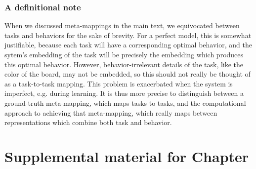 \subsection{A definitional note}
When we discussed meta-mappings in the main text, we equivocated between tasks and behaviors for the sake of brevity. For a perfect model, this is somewhat justifiable, because each task will have a corresponding optimal behavior, and the sytem's embedding of the task will be precisely the embedding which produces this optimal behavior. However, behavior-irrelevant details of the task, like the color of the board, may not be embedded, so this should not really be thought of as a task-to-task mapping. This problem is exacerbated when the system is imperfect, e.g. during learning. It is thus more precise to distinguish between a ground-truth meta-mapping, which maps tasks to tasks, and the computational approach to achieving that meta-mapping, which really maps between representations which combine both task and behavior. \par



\chapter{Supplemental material for Chapter } \label{appendix:zero_shot_via_homm}

